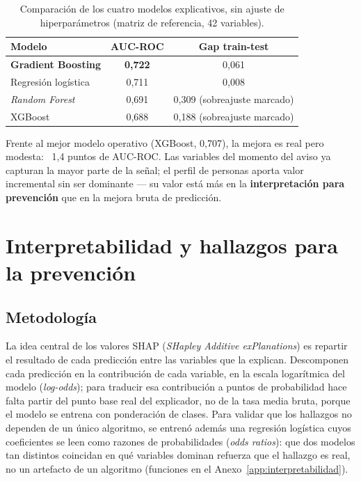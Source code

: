 \documentclass[11pt,a4paper]{article}
\begin{document}
\begin{table}[h]
\centering
\small
\begin{tabular}{lcc}
\toprule
\textbf{Modelo} & \textbf{AUC-ROC} & \textbf{Gap train-test} \\
\midrule
\textbf{Gradient Boosting} & \textbf{0,722} & 0,061 \\
Regresión logística & 0,711 & 0,008 \\
\emph{Random Forest} & 0,691 & 0,309 (sobreajuste marcado) \\
XGBoost & 0,688 & 0,188 (sobreajuste marcado) \\
\bottomrule
\end{tabular}
\caption{Comparación de los cuatro modelos explicativos, sin ajuste de hiperparámetros (matriz de referencia, 42 variables).}
\label{tab:comparacion_explicativo}
\end{table}

Frente al mejor modelo operativo (XGBoost, 0,707), la mejora es real pero modesta: ~1,4 puntos de AUC-ROC. Las variables del momento del aviso ya capturan la mayor parte de la señal; el perfil de personas aporta valor incremental sin ser dominante --- su valor está más en la \textbf{interpretación para prevención} que en la mejora bruta de predicción.

\section{Interpretabilidad y hallazgos para la prevención}

\subsection{Metodología}

La idea central de los valores SHAP (\emph{SHapley Additive exPlanations}) es repartir el resultado de cada predicción entre las variables que la explican. Descomponen cada predicción en la contribución de cada variable, en la escala logarítmica del modelo (\emph{log-odds}); para traducir esa contribución a puntos de probabilidad hace falta partir del punto base real del explicador, no de la tasa media bruta, porque el modelo se entrena con ponderación de clases. Para validar que los hallazgos no dependen de un único algoritmo, se entrenó además una regresión logística cuyos coeficientes se leen como razones de probabilidades (\emph{odds ratios}): que dos modelos tan distintos coincidan en qué variables dominan refuerza que el hallazgo es real, no un artefacto de un algoritmo (funciones en el Anexo~\ref{app:interpretabilidad}).
\end{document}

